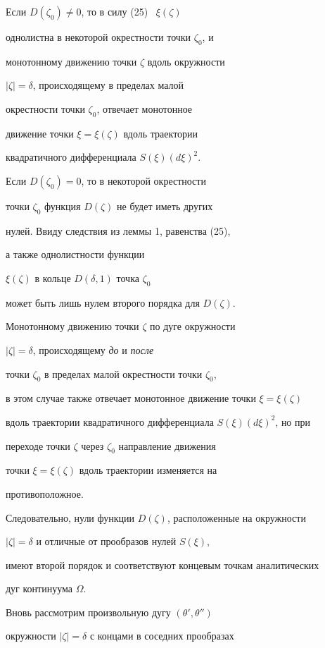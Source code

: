 \begin{pf}
Если $D(\zeta_{0})\ne0$, то в силу (25) \ $\xi(\zeta)$ 


однолистна в некоторой окрестности точки $\zeta_{0}$, и 


монотонному движению точки $\zeta$ вдоль окружности 


$|\zeta|=\delta$, происходящему в пределах малой 


окрестности точки $\zeta_{0}$, отвечает монотонное 


движение точки $\xi=\xi(\zeta)$ вдоль траектории


квадратичного дифференциала $S(\xi)(d\xi)^{2}$. 


Если $D(\zeta_{0})=0$, то в некоторой окрестности


точки $\zeta_{0}$ функция $D(\zeta)$ не будет иметь других


нулей. Ввиду следствия из леммы 1, равенства (25), 


а также однолистности функции 


$\xi(\zeta)$ в кольце $D(\delta,1)$ точка $\zeta_{0}$ 


может быть лишь нулем второго порядка для $D(\zeta)$. 


Монотонному движению точки $\zeta$ по дуге окружности 


$|\zeta|=\delta$, происходящему {\it до} и {\it после} 


точки $\zeta_{0}$ в пределах малой окрестности точки $\zeta_{0}$, 


в этом случае также отвечает монотонное движение точки $\xi=\xi(\zeta)$ 


вдоль траектории квадратичного дифференциала $S(\xi)(d\xi)^{2}$, но при


переходе точки $\zeta$ через $\zeta_{0}$ направление движения


точки $\xi=\xi(\zeta)$ вдоль траектории изменяется на 


противоположное.


Следовательно, нули функции $D(\zeta)$, расположенные на окружности


$|\zeta|=\delta$ и отличные от прообразов нулей $S(\xi)$, 


имеют второй порядок и соответствуют концевым точкам аналитических


дуг континуума $\Omega$.  





Вновь рассмотрим произвольную дугу $(\theta', \theta'')$


окружности $|\zeta|=\delta$ с концами в соседних прообразах



\end{pf}
